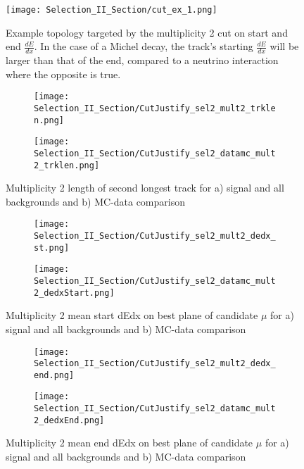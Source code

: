 \documentclass{article}
\begin{document}
\begin{figure}[h!]
  \centering
  \texttt{[image: Selection\_II\_Section/cut\_ex\_1.png]}
  \caption{Example topology targeted by the multiplicity 2 cut on start and end $\frac{dE}{dx}$.  In the case of a Michel decay, the track's starting $\frac{dE}{dx}$ will be larger than that of the end, compared to a neutrino interaction where the opposite is true. }
\label{fig:cut_ex_1}
\end{figure}

\begin{figure}[h!]
\centering
  \begin{subfigure}[t]{0.4\textwidth}
    \centering
    \texttt{[image: Selection\_II\_Section/CutJustify\_sel2\_mult2\_trklen.png]}
    \caption{ }
  \end{subfigure} 
  \hspace{20mm}
  \begin{subfigure}[t]{0.4\textwidth}
    \centering
    \texttt{[image: Selection\_II\_Section/CutJustify\_sel2\_datamc\_mult2\_trklen.png]}
    \caption{ }
  \end{subfigure} 

\caption{Multiplicity 2 length of second longest track for a) signal and all backgrounds and b) MC-data comparison }
\label{fig:cutjust_sel2_mult2_secondtrklen}
\end{figure}



\begin{figure}[h!]
\centering
  \begin{subfigure}[t]{0.4\textwidth}
    \centering
\texttt{[image: Selection\_II\_Section/CutJustify\_sel2\_mult2\_dedx\_st.png]}
    \caption{ }
  \end{subfigure} 
  \hspace{20mm}
  \begin{subfigure}[t]{0.4\textwidth}
    \centering
\texttt{[image: Selection\_II\_Section/CutJustify\_sel2\_datamc\_mult2\_dedxStart.png]}
    \caption{ }
  \end{subfigure} 
\caption{Multiplicity 2 mean start dEdx on best plane of candidate $\mu$ for a) signal and all backgrounds and b) MC-data comparison }
\label{fig:cutjust_sel2_mult2_dedxst}
\end{figure}

\begin{figure}[h!]
\centering
  \begin{subfigure}[t]{0.4\textwidth}
    \centering
\texttt{[image: Selection\_II\_Section/CutJustify\_sel2\_mult2\_dedx\_end.png]}
    \caption{ }
  \end{subfigure} 
  \hspace{20mm}
  \begin{subfigure}[t]{0.4\textwidth}
    \centering
\texttt{[image: Selection\_II\_Section/CutJustify\_sel2\_datamc\_mult2\_dedxEnd.png]}
  \caption{ }
  \end{subfigure} 
  
\caption{Multiplicity 2 mean end dEdx on best plane of candidate $\mu$ for a) signal and all backgrounds and b) MC-data comparison }
\label{fig:cutjust_sel2_mult2_dedxend}
\end{figure}
\end{document}
